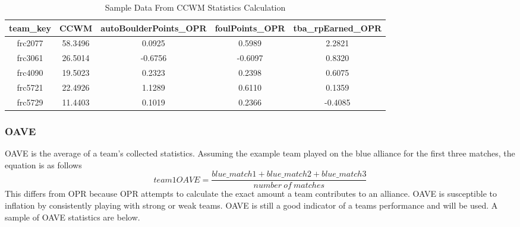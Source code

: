 \documentclass{article}
\begin{document}
\begin{table}[H]
\caption{Sample Data From CCWM Statistics Calculation}
\centering
\begin{tabular} { |c|c|c|c|c| }
\hline
team\_key & CCWM & autoBoulderPoints\_OPR & foulPoints\_OPR & tba\_rpEarned\_OPR \\
\hline
frc2077 & 58.3496 & 0.0925 & 0.5989 & 2.2821 \\
\hline
frc3061 & 26.5014 & -0.6756 & -0.6097 & 0.8320 \\
\hline
frc4090 & 19.5023 & 0.2323 & 0.2398 & 0.6075 \\
\hline
frc5721 & 22.4926 & 1.1289 & 0.6110 & 0.1359 \\
\hline
frc5729 & 11.4403 & 0.1019 & 0.2366 & -0.4085 \\
\hline
\end{tabular}
\label{table:CCWM}
\end{table}

\subsubsection{OAVE}
\par
OAVE is the average of a team's collected statistics. Assuming the example team played on the blue alliance for the first three matches, the equation is as follows
$$team1OAVE = \frac{blue\_match1 + blue\_match2 + blue\_match3}{number\ of\ matches}$$
This differs from OPR because OPR attempts to calculate the exact amount a team contributes to an alliance. OAVE is susceptible to inflation by consistently playing with strong or weak teams. OAVE is still a good indicator of a teams performance and will be used. A sample of OAVE statistics are below.

\begin{table}[H]
\caption{Sample Data From OAVE Statistics Calculation}
\centering
{}
\label{table:OAVE}
\end{table}
\end{document}
